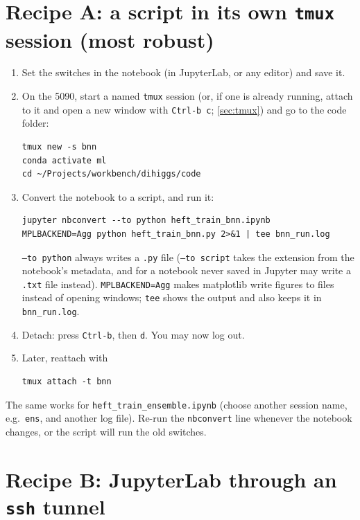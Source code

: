 \documentclass[11pt]{article}
\newcommand{\file}[1]{\nolinkurl{#1}}
\newcommand{\code}[1]{\texttt{#1}}
\begin{document}
\section{Recipe A: a script in its own \texttt{tmux} session (most robust)}

\begin{enumerate}
  \item Set the switches in the notebook (in JupyterLab, or any editor) and save it.
  \item On the 5090, start a named \code{tmux} session (or, if one is already running,
    attach to it and open a new window with \code{Ctrl-b c}; \cref{sec:tmux}) and go to the
    code folder:
\begin{lstlisting}[style=sh]
tmux new -s bnn
conda activate ml
cd ~/Projects/workbench/dihiggs/code
\end{lstlisting}
  \item Convert the notebook to a script, and run it:
\begin{lstlisting}[style=sh]
jupyter nbconvert --to python heft_train_bnn.ipynb
MPLBACKEND=Agg python heft_train_bnn.py 2>&1 | tee bnn_run.log
\end{lstlisting}
    \code{--to python} always writes a \file{.py} file (\code{--to script} takes the
    extension from the notebook's metadata, and for a notebook never saved in Jupyter may
    write a \file{.txt} file instead). \code{MPLBACKEND=Agg} makes matplotlib write figures to files instead of opening
    windows; \code{tee} shows the output and also keeps it in \file{bnn_run.log}.
  \item Detach: press \code{Ctrl-b}, then \code{d}. You may now log out.
  \item Later, reattach with
\begin{lstlisting}[style=sh]
tmux attach -t bnn
\end{lstlisting}
\end{enumerate}
\noindent The same works for \file{heft_train_ensemble.ipynb} (choose another session
name, e.g.\ \code{ens}, and another log file). Re-run the \code{nbconvert} line whenever
the notebook changes, or the script will run the old switches.

\section{Recipe B: JupyterLab through an \texttt{ssh} tunnel}
\end{document}
